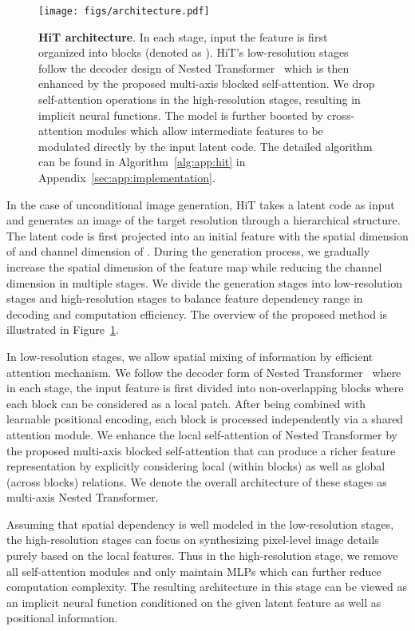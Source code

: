 \documentclass{article}
\newcommand{\app}[1]{#1}
\begin{document}
\begin{figure}[t]
  \centering
  \texttt{[image: figs/architecture.pdf]}
  \vspace{-0.8em}
  \caption{\textbf{HiT architecture}. In each stage, input the feature is first organized into blocks (denoted as ). HiT's low-resolution stages follow the decoder design of Nested Transformer~\cite{zhang2021aggregating} which is then enhanced by the proposed multi-axis blocked self-attention. We drop self-attention operations in the high-resolution stages, resulting in implicit neural functions. The model is further boosted by cross-attention modules which allow intermediate features to be modulated directly by the input latent code. The detailed algorithm can be found in \app{Algorithm~\ref{alg:app:hit} in Appendix~\ref{sec:app:implementation}}.}
  \label{fig:architecture}
\end{figure}

In the case of unconditional image generation, HiT takes a latent code  as input and generates an image of the target resolution through a hierarchical structure. The latent code is first projected into an initial feature with the spatial dimension of  and channel dimension of . 
During the generation process, we gradually increase the spatial dimension of the feature map while reducing the channel dimension in multiple stages. We divide the generation stages into low-resolution stages and high-resolution stages to balance feature dependency range in decoding and computation efficiency. The overview of the proposed method is illustrated in Figure~\ref{fig:architecture}. 



In low-resolution stages, we allow spatial mixing of information by efficient attention mechanism. We follow the decoder form of Nested Transformer~\cite{zhang2021aggregating} where in each stage, the input feature is first divided into non-overlapping blocks where each block can be considered as a local patch. After being combined with learnable positional encoding, each block is processed independently via a shared attention module. We enhance the local self-attention of Nested Transformer by the proposed multi-axis blocked self-attention that can produce a richer feature representation by explicitly considering local (within blocks) as well as global (across blocks) relations. We denote the overall architecture of these stages as multi-axis Nested Transformer.

Assuming that spatial dependency is well modeled in the low-resolution stages, the high-resolution stages can focus on synthesizing pixel-level image details purely based on the local features. Thus in the high-resolution stage, we remove all self-attention modules and only maintain MLPs which can further reduce computation complexity. The resulting architecture in this stage can be viewed as an implicit neural function conditioned on the given latent feature as well as positional information.
\end{document}
